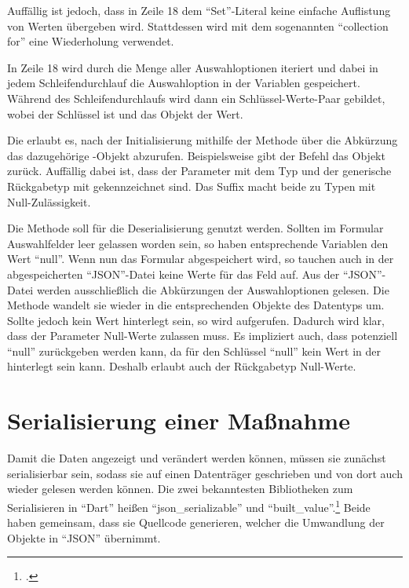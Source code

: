 Auffällig ist jedoch, dass in Zeile 18 dem \enquote{Set}-Literal keine einfache Auflistung von Werten übergeben wird.
Stattdessen wird mit dem sogenannten \enquote{collection for} eine Wiederholung verwendet.



In Zeile 18 wird durch die  Menge aller Auswahloptionen  iteriert und dabei in jedem Schleifendurchlauf die Auswahloption in der Variablen  gespeichert.
Während des Schleifendurchlaufs wird dann ein Schlüssel-Werte-Paar gebildet, wobei  der Schlüssel ist und das Objekt  der Wert.

Die   erlaubt es, nach der Initialisierung mithilfe der Methode   über die Abkürzung das dazugehörige -Objekt abzurufen.
Beispielsweise gibt der Befehl  das Objekt  zurück.
Auffällig dabei ist, dass der Parameter  mit dem Typ  und der generische Rückgabetyp mit  gekennzeichnet sind. Das Suffix  macht beide zu Typen mit Null-Zulässigkeit.



Die Methode  soll für die Deserialisierung genutzt werden.
 Sollten im Formular Auswahlfelder leer gelassen worden sein, so haben  entsprechende Variablen den Wert \enquote{null}.
Wenn nun das Formular abgespeichert wird, so tauchen auch in der abgespeicherten \enquote{JSON}-Datei keine Werte für das Feld auf.
Aus der \enquote{JSON}-Datei werden ausschließlich die Abkürzungen der Auswahloptionen gelesen.
Die Methode  wandelt sie wieder in die entsprechenden Objekte des Datentyps  um.
Sollte jedoch kein Wert hinterlegt sein, so wird  aufgerufen. Dadurch wird klar,
dass der Parameter Null-Werte zulassen muss.
Es impliziert auch,
dass potenziell \enquote{null} zurückgeben werden kann, da für den Schlüssel \enquote{null} kein Wert in der  hinterlegt sein kann.
Deshalb  erlaubt auch der Rückgabetyp  Null-Werte.


\section{Serialisierung einer Maßnahme}

Damit die Daten angezeigt und verändert werden können, müssen sie zunächst serialisierbar sein, sodass sie auf einen Datenträger geschrieben und von dort auch wieder gelesen werden können.
Die zwei bekanntesten Bibliotheken zum Serialisieren in \enquote{Dart} heißen \enquote{json_serializable} und \enquote{built_value}.\footcite[Vgl.][]{JSONAndSerialization}
Beide haben gemeinsam, dass sie Quellcode generieren, welcher die Umwandlung der Objekte in \enquote{JSON} übernimmt.


